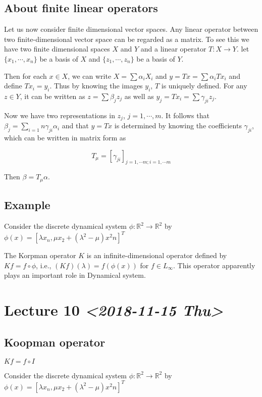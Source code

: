 \documentclass[11pt]{article}
\def\R{\mathbb{R}}
\begin{document}
\subsection{About finite linear operators}
\label{sec:org3aa6ac3}
Let us now consider finite dimensional vector spaces. Any linear operator
between two finite-dimensional vector space can be regarded as a matrix. To
see this we have two finite dimensional spaces \(X\) and \(Y\) and a linear
operator \(T \colon X \rightarrow Y\). let \(\{x_1, \cdots, x_n\}\) be a basis of
\(X\) and \(\{z_1, \cdots, z_n\}\) be a basis of \(Y\). 

Then for each \(x\in X\), we can write \(X = \sum \alpha_i X_i\) and \(y = Tx =
   \sum \alpha_i Tx_i\) and define \(Tx_i = y_i\). Thus by knowing the images
\(y_i\), \(T\) is uniquely defined. For any \(z \in Y\), it can be written as \(z =
   \sum \beta_j z_j\) as well as \(y_j = Tx_i = \sum \gamma_{ji}z_j\).

Now we have two representations in \(z_j\), \(j = 1, \cdots, m\). It follows that
\(\beta_j = \sum_{i=1}{n} \gamma_{ji} \alpha_i\) and that \(y = Tx\) is
determined by knowing the coefficients \(\gamma_{ji}\), which can be written in
matrix form as

$$T_\mu = [\gamma_{ji}]_{j=1, \cdots m; i =1, \cdots m}$$

Then \(\beta = T_\mu \alpha\).
\subsection{Example}
\label{sec:org19a7fcc}
Consider the discrete dynamical system \(\phi \colon \R^2 \rightarrow \R^2\) by
\(\phi(x) = [\lambda x_n, \mu x_2 + (\lambda^2 - \mu)x^2n]^T\)

The Korpman operator \(K\) is an infinite-dimensional operator defined by \(Kf =
   f\circ \phi\), i.e., \((Kf)(\lambda) = f(\phi(x))\) for \(f \in L_{\infty}\). This
operator apparently plays an important role in Dynamical system.
\section{Lecture 10 \textit{<2018-11-15 Thu>}}
\label{sec:orgca086a2}
\subsection{Koopman operator}
\label{sec:orgfaad19f}
\(Kf = f\circ I\)

Consider the discrete dynamical system \(\phi \colon \R^2 \rightarrow \R^2\) by
\(\phi(x) = [\lambda x_n, \mu x_2 + (\lambda^2 - \mu)x^2n]^T\)
\end{document}
